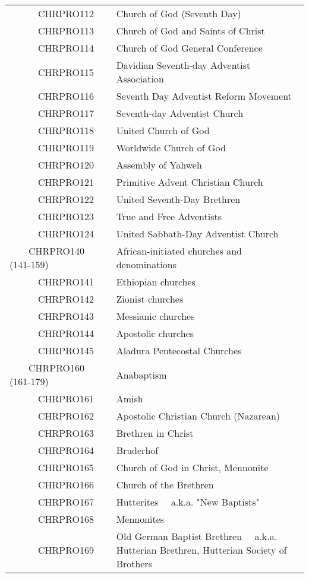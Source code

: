 \documentclass[12pt]{article}
\begin{document}
\begin{tiny}
\begin{center}
\begin{longtable}{|l|l|}
~~~~~~CHRPRO112 & Church of God (Seventh Day) \\
~~~~~~CHRPRO113 & Church of God and Saints of Christ \\
~~~~~~CHRPRO114 & Church of God General Conference \\
~~~~~~CHRPRO115 & Davidian Seventh-day Adventist Association \\
~~~~~~CHRPRO116 & Seventh Day Adventist Reform Movement \\
~~~~~~CHRPRO117 & Seventh-day Adventist Church \\
~~~~~~CHRPRO118 & United Church of God \\
~~~~~~CHRPRO119 & Worldwide Church of God \\
~~~~~~CHRPRO120 & Assembly of Yahweh \\
~~~~~~CHRPRO121 & Primitive Advent Christian Church \\
~~~~~~CHRPRO122 & United Seventh-Day Brethren \\
~~~~~~CHRPRO123 & True and Free Adventists \\
~~~~~~CHRPRO124 & United Sabbath-Day Adventist Church \\
~~~~CHRPRO140 (141-159) & African-initiated churches and denominations \\
~~~~~~CHRPRO141 & Ethiopian churches \\
~~~~~~CHRPRO142 & Zionist churches \\
~~~~~~CHRPRO143 & Messianic churches \\
~~~~~~CHRPRO144 & Apostolic churches \\
~~~~~~CHRPRO145 & Aladura Pentecostal Churches \\
~~~~CHRPRO160 (161-179) & Anabaptism \\
~~~~~~CHRPRO161 & Amish \\
~~~~~~CHRPRO162 & Apostolic Christian Church (Nazarean) \\
~~~~~~CHRPRO163 & Brethren in Christ \\
~~~~~~CHRPRO164 & Bruderhof \\
~~~~~~CHRPRO165 & Church of God in Christ, Mennonite \\
~~~~~~CHRPRO166 & Church of the Brethren \\
~~~~~~CHRPRO167 & Hutterites	~~a.k.a. "New Baptists" \\
~~~~~~CHRPRO168 & Mennonites \\
~~~~~~CHRPRO169 & Old German Baptist Brethren	~~a.k.a. Hutterian Brethren, Hutterian Society of Brothers \\

\end{longtable}
\end{center}
\end{tiny}
\end{document}
